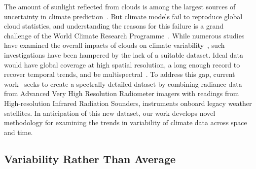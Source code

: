 \documentclass[letterpaper]{article} %
\newcommand{\citep}{\cite}
\begin{document}
The amount of sunlight reflected from clouds is among the largest
sources of uncertainty in climate
prediction~\citep{BoucherRandall2013}. But climate models fail to
reproduce global cloud statistics, and understanding the reasons for
this failure is a grand challenge of the World Climate Research
Programme~\citep{BonyStevens2015}.
While numerous
studies have examined the overall impacts of clouds on climate
variability~\citep{MyersMechoso2018,GrisePolvani2013,BenderRamanathan2012},
such investigations have been hampered by the lack of a suitable
dataset. Ideal data would have global coverage at high spatial
resolution, a long enough record to recover temporal trends, and be
multispectral~\citep{WielickiYoung2013}. 
To address this gap, current
work~\cite{StatenKahn2016,SchreierKahn2010,KahnFishbein2007} seeks to
create a 
spectrally-detailed dataset by %
combining radiance data from Advanced Very High Resolution Radiometer
imagers with readings from High-resolution 
Infrared Radiation Sounders, instruments onboard legacy weather
satellites. 
In anticipation of this new dataset, our work develops novel methodology
for examining the trends in variability of climate data across space
and time.

\subsection{Variability Rather Than Average}
\label{sec:vari-rath-than}
\end{document}
